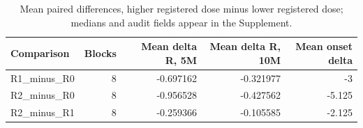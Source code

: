 \begin{table}[!htbp]
\centering
\caption{Mean paired differences, higher registered dose minus lower registered dose; medians and audit fields appear in the Supplement.}
\label{tab:table05-paired-R-differences-main}
\small
\setlength{\tabcolsep}{4pt}
\begin{tabular}{lrrrr}
\toprule
Comparison & Blocks & Mean delta R, 5M & Mean delta R, 10M & Mean onset delta \\
\midrule
R1\_minus\_R0 & 8 & -0.697162 & -0.321977 & -3 \\
R2\_minus\_R0 & 8 & -0.956528 & -0.427562 & -5.125 \\
R2\_minus\_R1 & 8 & -0.259366 & -0.105585 & -2.125 \\
\bottomrule
\end{tabular}
\end{table}
